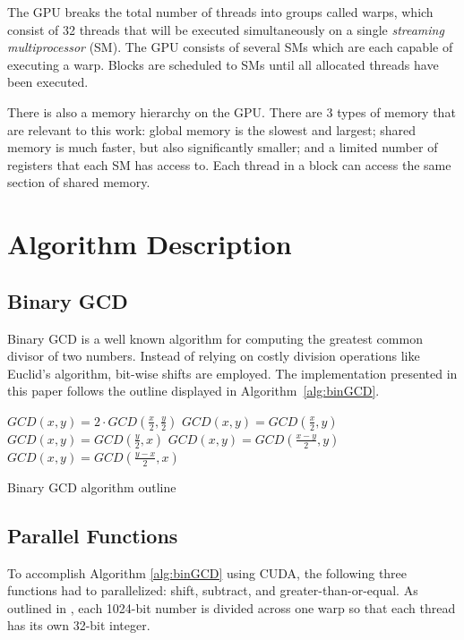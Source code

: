 \documentclass[12pt]{ucthesis}
\begin{document}
The GPU breaks the total number of threads into groups called warps, which 
consist of 32 threads that will be executed simultaneously on a single
\textit{streaming multiprocessor} (SM). The GPU consists of several SMs which 
are each capable of executing a warp. Blocks are scheduled to SMs until all 
allocated threads have been executed. 

There is also a memory hierarchy on the GPU. There are 3 types of memory 
that are relevant to this work: global memory is the slowest and 
largest; shared memory is much faster, but also significantly smaller; and 
a limited number of registers that each SM has access to. Each thread in a
block can access the same section of shared memory.

\section{Algorithm Description}
\subsection{Binary GCD}
Binary GCD is a well known algorithm for computing the greatest common divisor 
of two numbers. Instead of relying on costly division operations like Euclid's 
algorithm, bit-wise shifts are employed. The implementation
presented in this paper follows the outline displayed in Algorithm~\ref{alg:binGCD}.

\begin{algorithm}
   \nl{} {
      \nl{} {
         \nl$GCD(x, y) = 2 \cdot GCD(\frac{x}{2}, \frac{y}{2})$\;
      }\nl{} {
         \nl$GCD(x, y) = GCD(\frac{x}{2}, y)$\;
      }\nl{} {
         \nl$GCD(x, y) = GCD(\frac{y}{2}, x)$\;
      }\nl{} {
         \nl{} {
            \nl$GCD(x, y) = GCD(\frac{x - y}{2}, y)$\;
         }{
            \nl$GCD(x, y) = GCD(\frac{y - x}{2}, x)$\;
        }
      }
   }
   \caption{Binary GCD algorithm outline}
   \label{alg:binGCD}
\end{algorithm}

\subsection{Parallel Functions}
To accomplish Algorithm \ref{alg:binGCD} using CUDA, the following three 
functions had to parallelized: shift, subtract, and greater-than-or-equal. As 
outlined in \cite{fujimoto2009high}, each 1024-bit number is divided across one 
warp so that each thread has its own 32-bit integer. 
\end{document}
